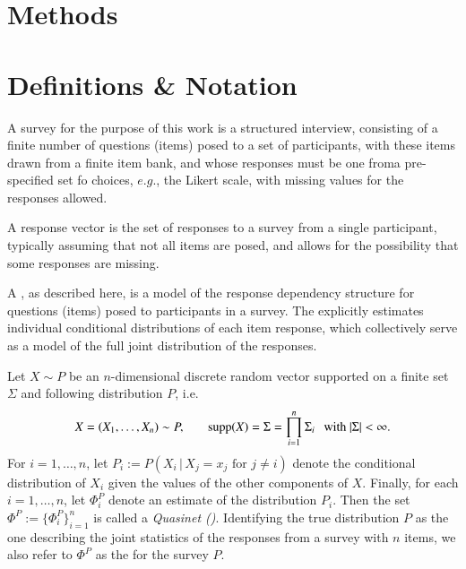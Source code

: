 \documentclass[onecolumn,10pt]{IEEEtran}
\begin{document}
\section*{Methods}

\section{Definitions \& Notation}

\begin{defn}[Survey]
  A survey for the purpose of this work is a structured interview, consisting of a finite number of questions (items) posed to a set of participants, with these items drawn from a finite item bank, and  whose responses must be one froma pre-specified set fo choices, $e.g.$, the Likert scale, with missing values for the responses allowed. 
\end{defn}


\begin{defn}
  A response vector is the set of responses to a survey from a single participant, typically assuming that not all items are posed, and allows for the possibility that some responses are missing.
\end{defn}


A \qnet, as described here, is a model of the response dependency  structure for questions (items) posed to participants in a survey.  The \qnet explicitly estimates individual conditional distributions of each item response, which collectively serve as a model of the full joint distribution of the responses. 

\begin{defn}[\qnet]
  \label{def:qnet}
  Let $X \sim P$ be an $n$-dimensional discrete random vector supported on a finite set $\Sigma$ and following distribution $P$, i.e. \[X = (X_1, \ldots, X_n) \sim P, \hspace{0.25in} \operatorname{supp}(X) =  \Sigma = \displaystyle\prod_{i=1}^n \Sigma_i \hspace{.1in} \text{with } |\Sigma| < \infty.\] For $i = 1, \ldots, n$, let $P_i := P(X_i\,|\,X_j=x_j \text{ for } j \neq i)$ denote the conditional distribution of $X_i$ given the values of the other components of $X$.  Finally, for each $i = 1, \ldots, n$, let $\Phi^P_i$ denote an estimate of the distribution $P_i$.  Then the set $\Phi^P := \{\Phi^P_i\}_{i=1}^n$ is called a \emph{Quasinet (\qnet)}. Identifying the true distribution $P$ as the one describing the joint statistics of the responses from a survey with $n$ items, we also refer to  $\Phi^P$ as the \qnet for the survey $P$.
\end{defn}
\end{document}
